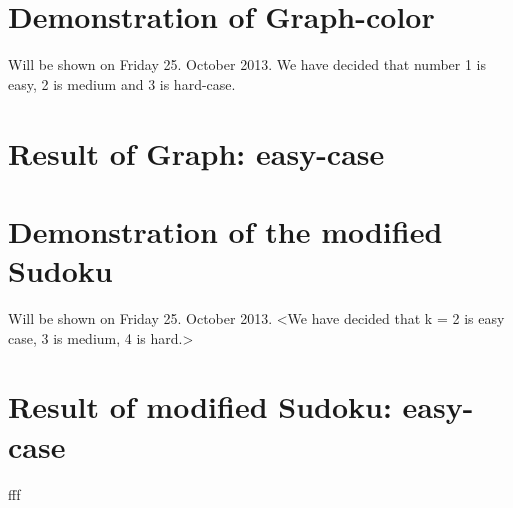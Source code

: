 \documentclass[12pt, a4paper]{article}
\begin{document}
\section{Demonstration of Graph-color}
Will be shown on Friday 25. October 2013.
We have decided that number 1 is easy, 2 is medium and 3 is hard-case. 

\section{Result of Graph: easy-case}

\section{Demonstration of the modified Sudoku}
Will be shown on Friday 25. October 2013.
<We have decided that k = 2 is easy case, 3 is medium, 4 is hard.>

\section{Result of modified Sudoku: easy-case}
fff
\end{document}
